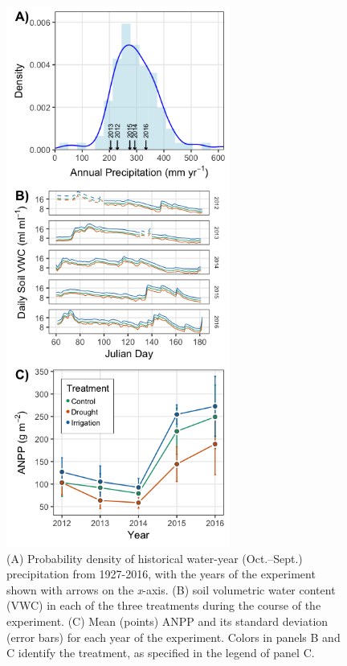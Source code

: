 \documentclass[fleqn,10pt,lineno]{wlpeerj} %
\begin{document}
\begin{figure}[!ht]
  \centering
      \includegraphics[height=7in]{../figures/data_panels.png}
  \caption{(A) Probability density of historical water-year (Oct.--Sept.) precipitation from 1927-2016, with the years of the experiment shown with arrows on the \emph{x}-axis. (B)  soil volumetric water content (VWC) in each of the three treatments during the course of the experiment.  (C) Mean (points) ANPP and its standard deviation (error bars) for each year of the experiment. Colors in panels B and C identify the treatment, as specified in the legend of panel C.}
\end{figure}
\end{document}
